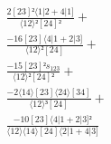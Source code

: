 \documentclass[varwidth, border=5pt]{standalone}
\begin{document}
\begin{my}
$\begin{gathered}
\scriptscriptstyle\frac{2[23]²⟨1|2+4|1]}{⟨12⟩²[24]²} +\\
\scriptscriptstyle\frac{-16[23]⟨4|1+2|3]}{⟨12⟩²[24]} +\\
\scriptscriptstyle\frac{-15[23]²s_{123}}{⟨12⟩²[24]²} +\\
\scriptscriptstyle\frac{-2⟨14⟩[23]⟨24⟩[34]}{⟨12⟩³[24]} +\\
\scriptscriptstyle\frac{-10[23]⟨4|1+2|3]²}{⟨12⟩⟨14⟩[24]⟨2|1+4|3]} \phantom{+}
\end{gathered}$
\end{my}
\end{document}
